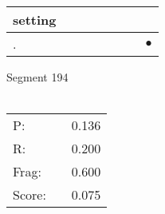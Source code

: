\documentclass[landscape]{article}
\newcommand{\ssp}{\hspace{2pt}}
\newcommand{\mex}{\cellcolor{g}$\bullet$}
\begin{document}
\begin{tabular}{|l|p{10pt}|p{10pt}|p{10pt}|p{10pt}|p{10pt}|p{10pt}|p{10pt}|}
\hline
\ssp setting \ssp&\hspace{2pt}&\hspace{2pt}&\hspace{2pt}&\hspace{2pt}&\hspace{2pt}&\hspace{2pt}&\hspace{2pt}\\
\hline
\ssp \cellcolor{ref6}. \ssp&\hspace{2pt}&\hspace{2pt}&\hspace{2pt}&\hspace{2pt}&\hspace{2pt}&\hspace{2pt}&\hspace{2pt}\mex\\
\hline
\end{tabular}

\vspace{6pt}
\noindent Segment 194\\\\
\noindent\begin{tabular}{lm{12pt}r}
\hline
P:&&0.136\\
R:&&0.200\\
Frag:&&0.600\\
Score:&&0.075\\
\end{tabular}

\newpage
\end{document}
